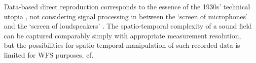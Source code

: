 Data-based direct reproduction corresponds to the essence of the 1930s'
technical utopia  \cite{Fletcher1934,Steinberg1934}, not considering signal
processing in between
the `screen of microphones' and
the `screen of loudspeakers' \cite[p.~572]{Snow1953}.
%
The spatio-temporal complexity of a sound field can be captured comparably
simply with appropriate measurement resolution, but the possibilities
for spatio-temporal manipulation of such recorded data is limited for
WFS purposes, cf. \cite{Sonke2000_diss,Hulsebos2004_diss,Vries2007_JASP}



